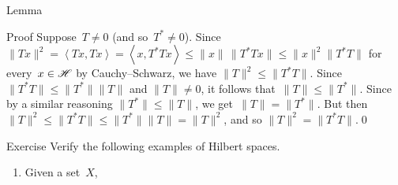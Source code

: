 \documentclass[a]{subfiles}
\begin{document}
\begin{parsec}[hilb]
\begin{point}{Lemma}
\begin{point}{Proof}
Suppose~$T\neq 0$ (and so~$T^*\neq 0$).
Since $\|Tx\|^2=\left<Tx,Tx\right>=\left<x,T^*Tx\right>
\leq \|x\|\,\|T^*Tx\|\leq \|x\|^2\|T^*T\|$
for every~$x\in \mathscr{H}$
by Cauchy--Schwarz,
we have $\|T\|^2\leq \|T^*T\|$.
Since~$\|T^*T\|\leq \|T^*\|\|T\|$
and $\|T\|\neq 0$,
it follows that~$\|T\|\leq \|T^*\|$.
Since by a similar reasoning $\|T^*\|\leq \|T\|$,
we get~$\|T\|=\|T^*\|$.
But then $\|T\|^2\leq \|T^*T\|\leq \|T^*\|\|T\|=\|T\|^2$,
and so $\|T\|^2=\|T^*T\|$.\qed
\end{point}
\end{point}
\begin{point}{Exercise}%
Verify the following examples of Hilbert spaces.
\begin{enumerate}
\item
	Given a set~$X$,
\end{enumerate}
\end{point}
\end{parsec}
\end{document}
